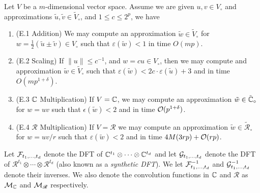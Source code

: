 \begin{proposition}
    Let $V$ be a $m$-dimensional vector space. Assume we are given $u, v \in V_\circ$ and approximations $\tilde{u}, \tilde{v} \in \tilde{V}_\circ$, and $1 \le c \le 2^p$, we have
    \begin{enumerate}
        \item (E.1 Addition) We may compute an approximation $\tilde{w} \in \tilde{V}_\circ$ for $w = \tfrac{1}{2}(\tilde{u} \pm \tilde{v}) \in V_\circ$ such that $\varepsilon(\tilde{w}) < 1$ in time $O(mp)$.
        \item (E.2 Scaling) If $\|u\| \le c^{-1}$, and $w = cu \in V_\circ$, then we may compute and approximation $\tilde{w} \in \tilde{V}_\circ$ such that $\varepsilon(\tilde{w}) < 2c \cdot \varepsilon(\tilde{u}) + 3$ and in time $O(mp^{1 + \delta})$.
        \item (E.3 ${\mathbb C}$ Multiplication) If $V = {\mathbb C}$, we may compute an approximation $\tilde{w} \in \tilde{{\mathbb C}}_\circ$ for $w = uv$ such that $\epsilon(\tilde{w}) < 2$ and in time $\mathcal O(p^{1 + \delta})$.
        \item (E.4 $\mathscr{R}$ Multiplication) If $V = \mathscr{R}$ we may compute an approximation $\tilde{w} \in \tilde{\mathscr{R}}_\circ$ for $w = uv/r$ such that $\varepsilon(\tilde{w}) < 2$ and in time $4M(3rp) + \mathcal O(rp)$.
    \end{enumerate}
\end{proposition}

Let $\mathcal F_{t_1, \ldots, t_d}$ denote the DFT of ${\mathbb C}^{t_1} \otimes \cdots \otimes {\mathbb C}^{t_d}$ and let $\mathcal G_{t_1, \ldots, t_d}$ denote the DFT of $\mathscr{R}^{t_1} \otimes \cdots \otimes \mathscr{R}^{t_d}$ (also known as a \emph{synthetic DFT}).
We let $\mathcal F^{-1}_{t_1, \ldots, t_d}$ and $\mathcal G_{t_1, \ldots, t_d}^{-1}$ denote their inverses.
We also denote the convolution functions in ${\mathbb C}$ and $\mathscr{R}$ as $\mathcal M_{\mathbb C}$ and $\mathcal M_\mathscr{R}$ respectively.

